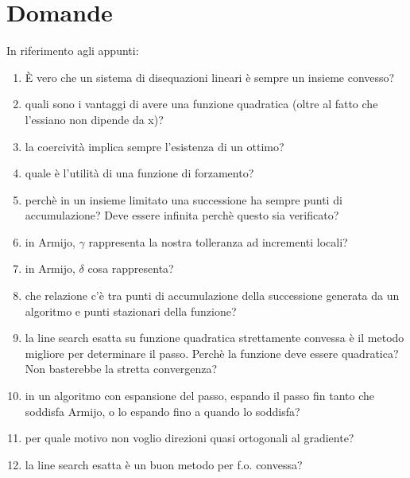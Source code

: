 \chapter{Domande}
\label{chp:questions}

In riferimento agli appunti:

\begin{enumerate}

	\item È vero che un sistema di disequazioni lineari è sempre un insieme convesso?

	\item quali sono i vantaggi di avere una funzione quadratica (oltre al fatto che l'essiano non dipende da x)?

	\item la coercività implica sempre l'esistenza di un ottimo?

	\item quale è l'utilità di una funzione di forzamento?

	\item perchè in un insieme limitato una successione ha sempre punti di accumulazione? Deve essere infinita perchè questo sia verificato?

	\item in Armijo, $\gamma$ rappresenta la nostra tolleranza ad incrementi locali?

	\item in Armijo, $\delta$ cosa rappresenta?

	\item che relazione c'è tra punti di accumulazione della successione generata da un algoritmo e punti stazionari della funzione?

	\item la line search esatta su funzione quadratica strettamente convessa è il metodo migliore per determinare il passo. Perchè la funzione deve essere quadratica? Non basterebbe la stretta convergenza?

	\item in un algoritmo con espansione del passo, espando il passo fin tanto che soddisfa Armijo, o lo espando fino a quando lo soddisfa?

	\item per quale motivo non voglio direzioni quasi ortogonali al gradiente?

	\item la line search esatta è un buon metodo per f.o. convessa?

\end{enumerate}

